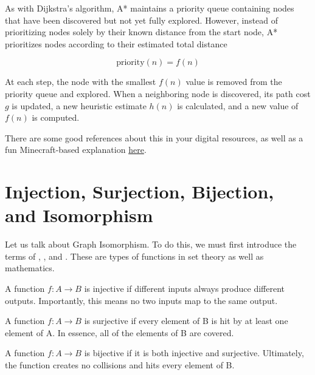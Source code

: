 As with Dijkstra's algorithm, A* maintains a priority queue containing nodes that have been discovered but not yet fully explored. However, instead of prioritizing nodes solely by their known distance from the start node, A* prioritizes nodes according to their estimated total distance

\[
	\text{priority}(n) = f(n)
\]

At each step, the node with the smallest $f(n)$ value is removed from the priority queue and explored. When a neighboring node is discovered, its path cost $g$ is updated, a new heuristic estimate $h(n)$ is calculated, and a new value of $f(n)$ is computed.

There are some good references about this in your digital resources, as well as a fun Minecraft-based explanation \href{https://www.youtube.com/watch?v=Zg0Cxn8AVZA}{here}.

\section{Injection, Surjection, Bijection, and Isomorphism}

Let us talk about Graph Isomorphism. To do this, we must first introduce the terms of , , and . These are types of functions in set theory as well as mathematics.

\begin{definition}[Injection]
	A function $f : A\rightarrow B$ is injective if different inputs always produce different outputs. Importantly, this means no two inputs map to the same output.
\end{definition}

\begin{definition}[Surjection]
	A function $f : A\rightarrow B$ is surjective if every element of B is hit by at least one element of A. In essence, all of the elements of B are covered.
\end{definition}
\begin{definition}[Bijection]
	A function $f : A\rightarrow B$ is bijective if it is both injective and surjective. Ultimately, the function creates no collisions and hits every element of B.
\end{definition}

